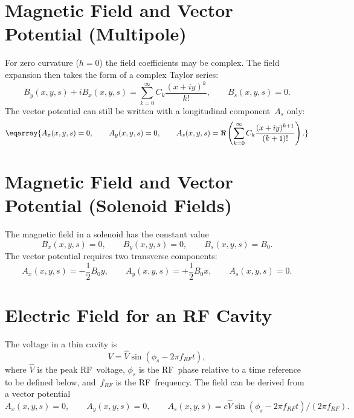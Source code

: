 \section{Magnetic Field and Vector Potential (Multipole)}
For zero curvature ($h = 0$) the field coefficients may be complex.
The field expansion then takes the form of a complex Taylor series:
\begin{equation}
B_y(x,y,s) + i B_x(x,y,s) = \sum_{k=0}^\infty C_k \frac{(x + i y)^k}{k!},
\qquad B_s(x,y,s) = 0.
\end{equation}
The vector potential can still be written with a longitudinal
component~$A_s$ only:
\begin{equation}\eqarray{
A_x(x,y,s)=0, \qquad A_y(x,y,s)=0, \qquad A_s(x,y,s)=
  \Re\left(\sum_{k=0}^\infty C_k\frac{(x+i y)^{k+1}}{(k+1)!}\right).
}\end{equation}
 
\section{Magnetic Field and Vector Potential (Solenoid Fields)}
The magnetic field in a solenoid has the constant value
\begin{equation}
B_x(x,y,s) = 0, \qquad B_y(x,y,s) = 0, \qquad B_s(x,y,s) = B_0.
\end{equation}
The vector potential requires two transverse components:
\begin{equation}
A_x(x,y,s) = - \frac{1}{2} B_0 y, \qquad A_y(x,y,s) = + \frac{1}{2} B_0 x,
\qquad A_s(x,y,s) = 0.
\end{equation}
 
\section{Electric Field for an RF Cavity}
The voltage in a thin cavity is
\begin{equation}
V = \hat{V} \sin(\phi_s - 2\pi f_{RF}t),
\end{equation}
where $\hat{V}$ is the peak RF~voltage,
$\phi_s$ is the RF~phase relative to a time reference to be defined
below,
and~$f_{RF}$ is the RF~frequency.
The field can be derived from a vector potential
\begin{equation}
A_x(x,y,s)=0, \qquad
A_y(x,y,s)=0, \qquad
A_s(x,y,s)=c\hat{V}\sin(\phi_s-2\pi f_{RF}t)/(2\pi f_{RF}).
\end{equation}
 
